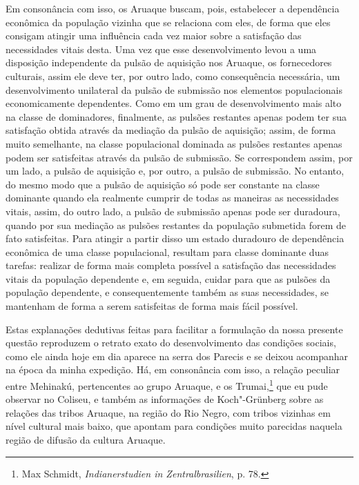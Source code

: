 Em consonância com isso, os Aruaque buscam, pois, estabelecer a
dependência econômica da população vizinha que se relaciona com eles, de
forma que eles consigam atingir uma influência cada vez maior sobre a
satisfação das necessidades vitais desta. Uma vez que esse
desenvolvimento levou a uma disposição independente da pulsão de
aquisição nos Aruaque, os fornecedores culturais, assim ele deve ter,
por outro lado, como consequência necessária, um desenvolvimento
unilateral da pulsão de submissão nos elementos populacionais
economicamente dependentes. Como em um grau de desenvolvimento mais alto
na classe de dominadores, finalmente, as pulsões restantes apenas podem
ter sua satisfação obtida através da mediação da pulsão de aquisição;
assim, de forma muito semelhante, na classe populacional dominada as
pulsões restantes apenas podem ser satisfeitas através da pulsão de
submissão. Se correspondem assim, por um lado, a pulsão de aquisição e,
por outro, a pulsão de submissão. No entanto, do mesmo modo que a pulsão
de aquisição só pode ser constante na classe dominante quando ela
realmente cumprir de todas as maneiras as necessidades vitais, assim, do
outro lado, a pulsão de submissão apenas pode ser duradoura, quando por
sua mediação as pulsões restantes da população submetida forem de fato
satisfeitas. Para atingir a partir disso um estado duradouro de
dependência econômica de uma classe populacional, resultam para classe
dominante duas tarefas: realizar de forma mais completa possível a
satisfação das necessidades vitais da população dependente e, em
seguida, cuidar para que as pulsões da população dependente, e
consequentemente também as suas necessidades, se mantenham de forma a
serem satisfeitas de forma mais fácil possível.

Estas explanações dedutivas feitas para facilitar a formulação da nossa
presente questão reproduzem o retrato exato do desenvolvimento das
condições sociais, como ele ainda hoje em dia aparece na serra dos
Parecis e se deixou acompanhar na época da minha expedição. Há, em
consonância com isso, a relação peculiar entre Mehinakú, pertencentes ao
grupo Aruaque, e os Trumai,\footnote{Max Schmidt, \emph{Indianerstudien
  in Zentralbrasilien}, p. 78.} que eu pude observar no Coliseu, e
também as informações de Koch"-Grünberg sobre as relações das tribos
Aruaque, na região do Rio Negro, com tribos vizinhas em nível cultural
mais baixo, que apontam para condições muito parecidas naquela região
de difusão da cultura Aruaque.

